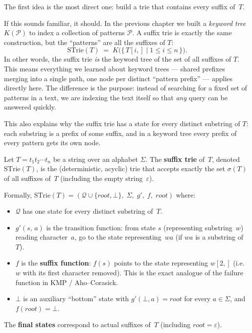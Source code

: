 The first idea is the most direct one: build a trie that contains every
suffix of~$T$.

If this sounds familiar, it should.
In the previous chapter we built a \emph{keyword tree} $K(\mathcal{P})$
to index a collection of patterns $\mathcal{P}$.
A suffix trie is exactly the same construction, but the ``patterns'' are
all the suffixes of $T$:
\[
  \mathrm{STrie}(T)
  \;=\;
  K\!\bigl(\{\, T[i{,}] \mid 1 \le i \le n \,\}\bigr).
\]
In other words, the suffix trie \emph{is} the keyword tree of the set of
all suffixes of $T$.
This means everything we learned about keyword trees --- shared prefixes
merging into a single path, one node per distinct ``pattern prefix'' ---
applies directly here.
The difference is the purpose: instead of searching for a fixed set of
patterns in a text, we are indexing the text itself so that \emph{any}
query can be answered quickly.

This also explains why the suffix trie has a state for every distinct
substring of $T$: each substring is a prefix of some suffix, and in a
keyword tree every prefix of every pattern gets its own node.

\begin{definition}
  \label{def:strie}
  Let $T = t_1 t_2 \cdots t_n$ be a string over an alphabet $\Sigma$.
  The \textbf{suffix trie} of~$T$, denoted $\mathrm{STrie}(T)$, is the
  (deterministic, acyclic) trie that accepts exactly the set $\sigma(T)$
  of all suffixes of~$T$ (including the empty string~$\varepsilon$).

  Formally, $\mathrm{STrie}(T) = (\mathcal{Q} \cup \{root, \bot\},\;
  \Sigma,\; g',\; f,\; root)$ where:
  \begin{itemize}[nosep]
    \item $\mathcal{Q}$ has one state for every distinct substring of~$T$.
    \item $g'(s,\, a)$ is the transition function: from state $s$
          (representing substring~$w$) reading character~$a$, go to the state
          representing~$wa$ (if $wa$ is a substring of~$T$).
    \item $f$ is the \textbf{suffix function}: $f(s)$ points to the state
          representing $w[2{,}]$ (i.e.\ $w$ with its first character removed).
          This is the exact analogue of the failure function in KMP /
          Aho--Corasick.
    \item $\bot$ is an auxiliary ``bottom'' state with
          $g'(\bot, a) = root$ for every $a \in \Sigma$, and
          $f(root) = \bot$.
  \end{itemize}
  The \textbf{final states} correspond to actual suffixes of~$T$
  (including $root = \varepsilon$).
\end{definition}

